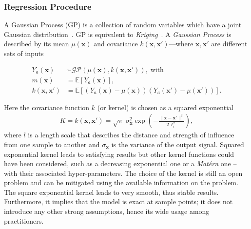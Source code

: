 \subsubsection{Regression Procedure}\label{sec:regression}


A Gaussian Process (GP) is a collection of random variables which have a joint Gaussian distribution~\cite{rasmussen2006}. GP is equivalent to \textit{Kriging}~\cite{krige1989}. A \textit{Gaussian Process} is described by its mean $\mu(\mathbf{x})$ and covariance $k(\mathbf{x},\mathbf{x}')$---where $\mathbf{x}, \mathbf{x}'$ are different sets of inputs

\begin{align}
Y_a(\mathbf{x})&\sim \mathcal{GP}(\mu(\mathbf{x}), k(\mathbf{x},\mathbf{x}')), \;\text{with} \\
m(\mathbf{x}) &= \mathbb{E}\left[ Y_a(\mathbf{x})  \right], \nonumber \\
k(\mathbf{x},\mathbf{x}') &= \mathbb{E}\left[ (Y_a(\mathbf{x}) -\mu(\mathbf{x}))(Y_a(\mathbf{x}')-\mu(\mathbf{x}')) \right] \nonumber.
\end{align}

Here the covariance function $k$ (or kernel) is chosen as a squared exponential
\begin{align} 
K = k(\mathbf{x}, \mathbf{x}') = \sqrt{\pi} \; \sigma_\mathbf{x}^2 \exp\left(-\frac{\|\mathbf{x} - \mathbf{x}'\|^2}{2\,\ell_i^2}\right), 
\end{align}
where $l$ is a length scale that describes the distance and strength of influence from one sample to another and $\sigma_\mathbf{x}$ is the variance of the output signal. Squared exponential kernel leads to satisfying results but other kernel functions could have been considered, such as a decreasing exponential one or a \emph{Matérn} one -- with their associated hyper-parameters. The choice of the kernel is still an open problem and can be mitigated using the available information on the problem. The square exponential kernel leads to very smooth, thus stable results. Furthermore, it implies that the model is exact at sample points; it does not introduce any other strong assumptions, hence its wide usage among practitioners.

